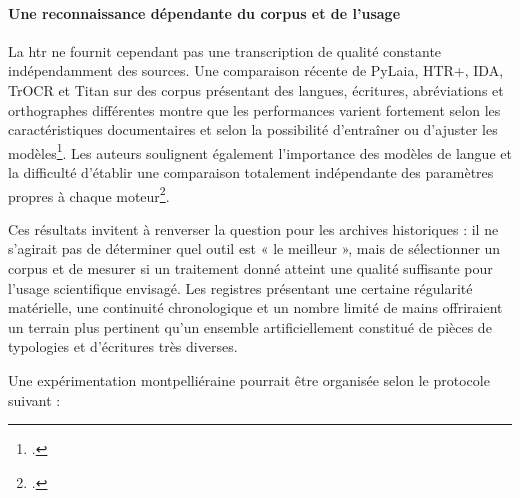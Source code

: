 \paragraph{Une reconnaissance dépendante du corpus et de l'usage}

La \gls{htr} ne fournit cependant pas une transcription de qualité constante indépendamment des sources. Une comparaison récente de PyLaia, HTR+, IDA, TrOCR et Titan sur des corpus présentant des langues, écritures, abréviations et orthographes différentes montre que les performances varient fortement selon les caractéristiques documentaires et selon la possibilité d'entraîner ou d'ajuster les modèles\footcite{RomeinRabusLeifertStroebel2025}. Les auteurs soulignent également l'importance des modèles de langue et la difficulté d'établir une comparaison totalement indépendante des paramètres propres à chaque moteur\footcite{RomeinRabusLeifertStroebel2025}.

Ces résultats invitent à renverser la question pour les archives historiques : il ne s'agirait pas de déterminer quel outil est « le meilleur », mais de sélectionner un corpus et de mesurer si un traitement donné atteint une qualité suffisante pour l'usage scientifique envisagé. Les registres présentant une certaine régularité matérielle, une continuité chronologique et un nombre limité de mains offriraient un terrain plus pertinent qu'un ensemble artificiellement constitué de pièces de typologies et d'écritures très diverses.

Une expérimentation montpelliéraine pourrait être organisée selon le protocole suivant :

